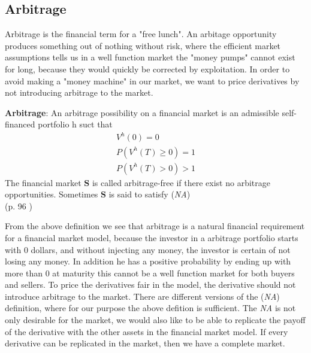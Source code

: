 \subsection{Arbitrage}
Arbitrage is the financial term for a "free lunch". An arbitage opportunity produces something out of nothing without risk, where the efficient market assumptions tells us in a well function market the "money pumps" cannot exist for long, because they would quickly be corrected by exploitation. In order to avoid making a "money machine" in our market, we want to price derivatives by not introducing arbitrage to the market.  
\theoremstyle{definition}
\begin{definition}{\textbf{Arbitrage}:}
An arbitrage possibility on a financial market is an admissible self-financed portfolio h suct that
\begin{equation}\label{Arbitrage}
\begin{split}
V^{h}(0)=0\\
P(V^{h}(T)\geq 0)=1\\
P(V^{h}(T)>0)>1
\end{split}
\end{equation}
The financial market $\bm{S}$ is called arbitrage-free if there exist no arbitrage opportunities. Sometimes $\bm{S}$ is said to satisfy (\textit{NA})\\
(p. 96 \parencite{finKont})
\end{definition}
From the above definition we see that arbitrage is a natural financial requirement for a financial market model, because the investor in a arbitrage portfolio starts with 0 dollars, and without injecting any money, the investor is certain of not losing any money. In addition he has a positive probability by ending up with more than 0 at maturity this cannot be a well function market for both buyers and sellers. To price the derivatives fair in the model, the derivative should not introduce arbitrage to the market. There are different versions of the (\textit{NA}) definition, where for our purpose the above defition is sufficient. The \textit{NA} is not only desirable for the market, we would also like to be able to replicate the payoff of the derivative with the other assets in the financial market model. If every derivative can be replicated in the market, then we have a complete market. 


